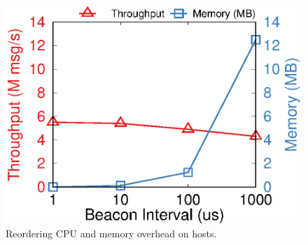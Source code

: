 \begin{figure}[t!]
	\begin{minipage}{.31\textwidth}
    	\centering
		\includegraphics[width=\textwidth]{gnuplot/reorder_receiver.eps}
		\caption{Reordering CPU and memory overhead on hosts.}
		\label{fig:reorder-overhead}


\end{minipage}
\end{figure}
